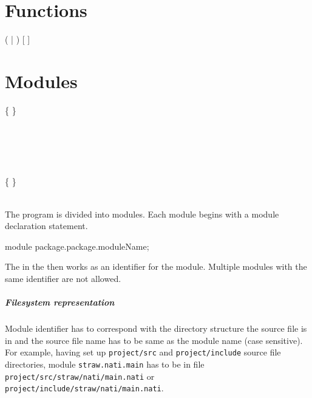 \chapter{Functions}
\begin{grammar}
	 (  |  ) [ \kwd{\&} ]   \\
\end{grammar}

\chapter{Modules}
\begin{grammar}
	   \kwd{;} \{  \} \\
	\\
	  \\
		\grAltLn {} \\
		\grAltLn {} \\
		\grAltLn {} \\
	  \{  \} \kwd{:} \\
	 \kwd{\{}  \kwd{\}} \\
\end{grammar}

The program is divided into modules. Each module begins with a module declaration statement.
\begin{code}
module package.package.moduleName;
\end{code}

The  in the  then works as an identifier for the module. Multiple modules with the same identifier are not allowed.

\paragraph{Filesystem representation} Module identifier has to correspond with the directory structure the source file is in and the source file name has to be same as the module name (case sensitive). For example, having set up \verb|project/src| and \verb|project/include| source file directories, module \verb|straw.nati.main| has to be in file \verb|project/src/straw/nati/main.nati| or \verb|project/include/straw/nati/main.nati|.

